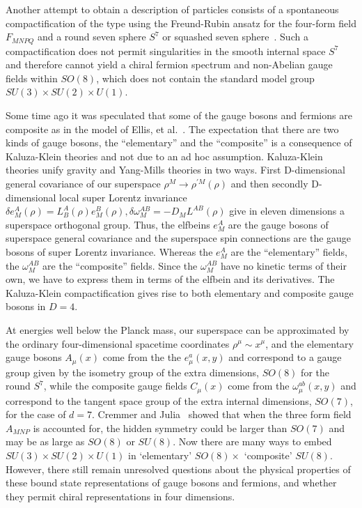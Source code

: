 \documentclass[a4paper,12pt]{article}
\begin{document}
Another attempt to obtain a description of particles consists of a spontaneous
compactification of the type using the Freund-Rubin ansatz for
the four-form field $F_{MNPQ}$ and a round seven sphere $S^7$ or
squashed seven sphere~\cite{Englert}. Such a compactification
does not permit singularities in the smooth internal space $S^7$ and therefore cannot
yield a chiral fermion spectrum and non-Abelian gauge fields within $SO(8)$, which
does not contain the standard model group $SU(3)\times SU(2)\times U(1)$.

Some time ago it was
speculated that some of the gauge bosons and fermions are composite as in the model
of Ellis, et al.~\cite{Ellis}. The expectation that there are two kinds of gauge
bosons, the ``elementary'' and the ``composite'' is a consequence of Kaluza-Klein
theories and not due to an ad hoc assumption. Kaluza-Klein theories unify gravity
and Yang-Mills theories in two ways. First D-dimensional general covariance of our
superspace $\rho^M\rightarrow \rho^{'M}(\rho)$ and then secondly D-dimensional local
super Lorentz invariance $\delta e_M^A(\rho)=L^A_B(\rho)e^B_M(\rho),
\delta\omega^{AB}_M=-D_ML^{AB}(\rho)$ give in eleven dimensions a superspace
orthogonal group. Thus, the elfbeins $e^A_M$ are the gauge bosons of superspace
general covariance and the superspace spin connections are the gauge bosons of
super Lorentz invariance. Whereas the $e^A_M$ are the ``elementary'' fields, the
$\omega^{AB}_M$ are the ``composite'' fields. Since the $\omega^{AB}_M$ have no
kinetic terms of their own, we have to express them in terms of the elfbein and its
derivatives. The Kaluza-Klein compactification gives rise to both elementary and
composite gauge bosons in $D=4$.

At energies well below the Planck mass, our superspace can be
approximated by the ordinary four-dimensional spacetime
coordinates $\rho^\mu\sim x^\mu$, and the elementary gauge
bosons $A_\mu(x)$ come from the the $e^a_\mu (x,y)$ and
correspond to a gauge group given by the isometry group of the
extra dimensions, $SO(8)$ for the round $S^7$, while the
composite gauge fields $C_\mu(x)$ come from the
$\omega^{ab}_\mu(x,y)$ and correspond to the tangent space group
of the extra internal dimensions, $SO(7)$, for the case of $d=7$.
Cremmer and Julia~\cite{Cremmer} showed that when the three form
field $A_{MNP}$ is accounted for, the hidden symmetry  could be
larger than $SO(7)$ and may be as large as $SO(8)$ or $SU(8)$.
Now there are many ways to embed $SU(3)\times SU(2)\times U(1)$
in `elementary' $SO(8)\times$ `composite' $SU(8)$. However, there
still remain unresolved questions about the physical properties
of these bound state representations of gauge bosons and
fermions, and whether they permit chiral representations in four dimensions.
\end{document}

